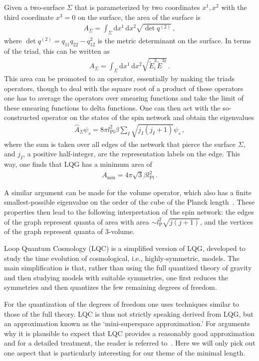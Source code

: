 \documentclass{article}
\def\beqn{\begin{eqnarray}}
\def\eeqn{\end{eqnarray}}
\begin{document}
Given a two-surface $\Sigma$ that is
parameterized by two coordinates $x^1,x^2$ with the third coordinate $x^3 = 0$ on the surface, the area of the surface is
\beqn
A_\Sigma = \int_\Sigma \mathrm{d}x^1 \, \mathrm{d}x^2 \sqrt{\det q^{(2)}} \,,
\eeqn
where $\det q^{(2)} = q_{11}q_{22}-q_{12}^2$ is the metric determinant on the surface. In terms of
the triad, this can be written as
\beqn
A_\Sigma = \int_\Sigma \mathrm{d}x^1 \, \mathrm{d}x^2 \sqrt{\tilde E^3_i \tilde E^{3i}} \,.
\eeqn
This area can be promoted to an operator, essentially by making the triads operators, though to deal 
with the square root of a product of these operators one has to average the operators over smearing
functions and take the limit of these smearing functions to delta functions. One can then act with the so-constructed operator on the states of the spin network and obtain the eigenvalues
\beqn
\hat A_\Sigma \psi_s = 8 \pi l^2_{\mathrm{Pl}} \beta \sum_I \sqrt{j_I(j_I + 1)} \psi_s \,,
 \eeqn
where the sum is taken over all edges of the network that pierce the surface $\Sigma$, and $j_I$, a positive half-integer, are 
 the representation labels on the edge. This way, one finds that {\sc LQG} has a minimum area of 
\beqn
A_{\min} = 4 \pi \sqrt{3} \beta l^2_{\mathrm{Pl}} \,.
\eeqn 

A similar argument can be made for the volume operator, which also has a finite smallest-possible eigenvalue on the order
of the cube of the Planck length~\cite{Rovelli:1994ge,Thiemann:1996au,Ashtekar:1997fb}. These properties then lead 
to the following interpretation of the spin network:
the edges of the graph represent quanta of area with area $\sim l_{\mathrm{P}}^2 \sqrt{j(j+1)}$, and the vertices of the graph represent quanta of 3-volume. 

Loop Quantum Cosmology ({\sc LQC}) is a simplified version of LQG, developed
to study the time evolution of cosmological, i.e., highly-symmetric, models. The main simplification is that, rather than using the full quantized
theory of gravity and then studying models with suitable symmetries, one first reduces the symmetries and then quantizes
the few remaining degrees of freedom. 

For the quantization of the degrees of freedom one uses techniques similar to
those of the full theory. {\sc LQC} is thus not strictly speaking derived from {\sc LQG}, but an
approximation known as the `mini-superspace approximation.' For arguments why it is plausible
to expect that {\sc LQC} provides a reasonably good approximation and for a detailed treatment, the
reader is referred to~\cite{Ashtekar:2003hd,Ashtekar:2011ni,Bojowald:2008zzb,Bojowald:2007bg,MenaMarugan:2011me}. Here we will only pick out one
aspect that is particularly interesting for our theme of the minimal length.
\end{document}
